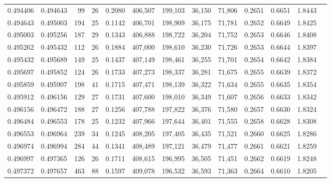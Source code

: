 \begin{tabular}{rrrrrrrrrrrrr}
0.494406 & 0.494643 &    99 &  26 &                                     0.2080 & 406,507 & 199,103 &  36,150 &  71,806 & 0.2651 & 0.6651 & 1.8443 \\
0.494643 & 0.495003 &   194 &  25 &                                     0.1142 & 406,701 & 198,909 &  36,175 &  71,781 & 0.2652 & 0.6649 & 1.8425 \\
0.495003 & 0.495256 &   187 &  29 &                                     0.1343 & 406,888 & 198,722 &  36,204 &  71,752 & 0.2653 & 0.6646 & 1.8408 \\
0.495262 & 0.495432 &   112 &  26 &                                     0.1884 & 407,000 & 198,610 &  36,230 &  71,726 & 0.2653 & 0.6644 & 1.8397 \\
0.495432 & 0.495689 &   149 &  25 &                                     0.1437 & 407,149 & 198,461 &  36,255 &  71,701 & 0.2654 & 0.6642 & 1.8384 \\
0.495697 & 0.495852 &   124 &  26 &                                     0.1733 & 407,273 & 198,337 &  36,281 &  71,675 & 0.2655 & 0.6639 & 1.8372 \\
0.495859 & 0.495907 &   198 &  41 &                                     0.1715 & 407,471 & 198,139 &  36,322 &  71,634 & 0.2655 & 0.6635 & 1.8354 \\
0.495912 & 0.496156 &   129 &  27 &                                     0.1731 & 407,600 & 198,010 &  36,349 &  71,607 & 0.2656 & 0.6633 & 1.8342 \\
0.496156 & 0.496472 &   188 &  27 &                                     0.1256 & 407,788 & 197,822 &  36,376 &  71,580 & 0.2657 & 0.6630 & 1.8324 \\
0.496484 & 0.496553 &   178 &  25 &                                     0.1232 & 407,966 & 197,644 &  36,401 &  71,555 & 0.2658 & 0.6628 & 1.8308 \\
0.496553 & 0.496964 &   239 &  34 &                                     0.1245 & 408,205 & 197,405 &  36,435 &  71,521 & 0.2660 & 0.6625 & 1.8286 \\
0.496974 & 0.496994 &   284 &  44 &                                     0.1341 & 408,489 & 197,121 &  36,479 &  71,477 & 0.2661 & 0.6621 & 1.8259 \\
0.496997 & 0.497365 &   126 &  26 &                                     0.1711 & 408,615 & 196,995 &  36,505 &  71,451 & 0.2662 & 0.6619 & 1.8248 \\
0.497372 & 0.497657 &   463 &  88 &                                     0.1597 & 409,078 & 196,532 &  36,593 &  71,363 & 0.2664 & 0.6610 & 1.8205 \\

\end{tabular}
